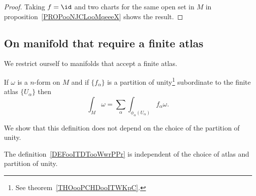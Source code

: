 \begin{proof}
    Taking \( f=\id\) and two charts for the same open set in \( M\) in proposition~\ref{PROPooNJCLooMqeeeX} shows the result.
\end{proof}

\subsection{On manifold that require a finite atlas}

We restrict ourself to manifolds that accept a finite atlas.

\begin{definition}      \label{DEFooITDTooWwrPPr}
    If \( \omega\) is a \( n\)-form on \( M\) and if \( \{ f_{\alpha} \} \) is a partition of unity\footnote{See theorem~\ref{THOooPCHDooITWKpC}.} subordinate to the finite atlas \( \{ U_{\alpha} \}\) then
    \begin{equation}
        \int_M\omega=\sum_{\alpha}\int_{\phi_{\alpha}(U_{\alpha})}f_{\alpha}\omega.
    \end{equation}
\end{definition}

We show that this definition does not depend on the choice of the partition of unity.
\begin{lemma} \label{LEMooCMIZooHhHaHV}
    The definition~\ref{DEFooITDTooWwrPPr} is independent of the choice of atlas and partition of unity.
\end{lemma}

